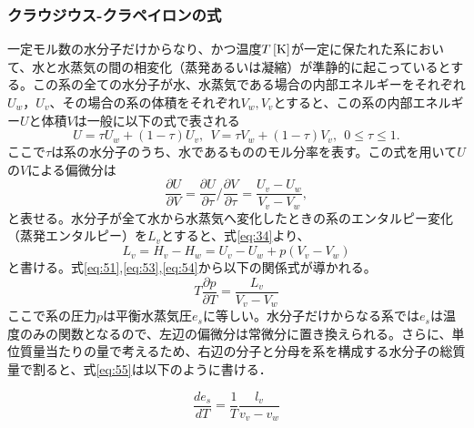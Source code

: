 \documentclass{ltjsarticle}
\begin{document}
\subsubsection{クラウジウス-クラペイロンの式}\label{sec:clausius}
一定モル数の水分子だけからなり、かつ温度$T\,[\rm{K}]$が一定に保たれた系において、水と水蒸気の間の相変化（蒸発あるいは凝縮）が準静的に起こっているとする。この系の全ての水分子が水、水蒸気である場合の内部エネルギーをそれぞれ$U_{w}，U_{v}$、その場合の系の体積をそれぞれ$V_{w}, V_{v}$とすると、この系の内部エネルギー$U$と体積$V$は一般に以下の式で表される
\begin{equation}\label{eq:52}
 U=\tau U_{w}+(1-\tau)U_{v},\ \ V=\tau V_{w}+(1-\tau)V_{v},\ \ 0 \le \tau \le 1.
\end{equation}
ここで$\tau$は系の水分子のうち、水であるもののモル分率を表す。この式を用いて$U$の$V$による偏微分は
\begin{equation}\label{eq:53}
 \frac{\partial U}{\partial V}=\frac{\partial U}{\partial \tau} {\bigg /} \frac{\partial V}{\partial \tau} = \frac{U_{v}-U_{w}}{V_{v}-V_{w}},
\end{equation}
と表せる。水分子が全て水から水蒸気へ変化したときの系のエンタルピー変化（蒸発エンタルピー）を$L_{v}$とすると、式\eqref{eq:34}より、
\begin{equation}\label{eq:54}
 L_{v}=H_{v}-H_{w}=U_{v}-U_{w}+p(V_{v}-V_{w})
\end{equation}
と書ける。式\eqref{eq:51},\eqref{eq:53},\eqref{eq:54}から以下の関係式が導かれる。
\begin{equation}\label{eq:55}
 T \frac{\partial p}{\partial T}=\frac{L_{v}}{V_{v}-V_{w}}
\end{equation}
ここで系の圧力$p$は平衡水蒸気圧$e_{s}$に等しい。水分子だけからなる系では$e_{s}$は温度のみの関数となるので、左辺の偏微分は常微分に置き換えられる。さらに、単位質量当たりの量で考えるため、右辺の分子と分母を系を構成する水分子の総質量で割ると、式\eqref{eq:55}は以下のように書ける．

\begin{equation}\label{eq:56}
 \frac{de_{s}}{dT}=\frac{1}{T}\frac{l_{v}}{v_{v}-v_{w}}
\end{equation}
\end{document}
